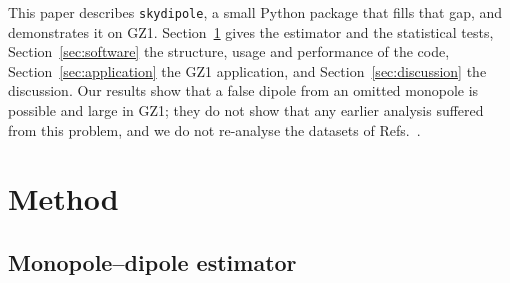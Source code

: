 \documentclass[preprint,12pt]{elsarticle}
\begin{document}
This paper describes \texttt{skydipole}, a small Python package that fills that gap, and demonstrates it on GZ1.
Section~\ref{sec:method} gives the estimator and the statistical tests, Section~\ref{sec:software} the structure, usage and performance of the code, Section~\ref{sec:application} the GZ1 application, and Section~\ref{sec:discussion} the discussion.
Our results show that a false dipole from an omitted monopole is possible and large in GZ1; they do not show that any earlier analysis suffered from this problem, and we do not re-analyse the datasets of Refs.~\cite{Longo2011,Shamir2012,Shamir2016,Shamir2020,Shamir2022}.

\section{Method}
\label{sec:method}

\subsection{Monopole--dipole estimator}
\label{sec:estimator}
\end{document}
